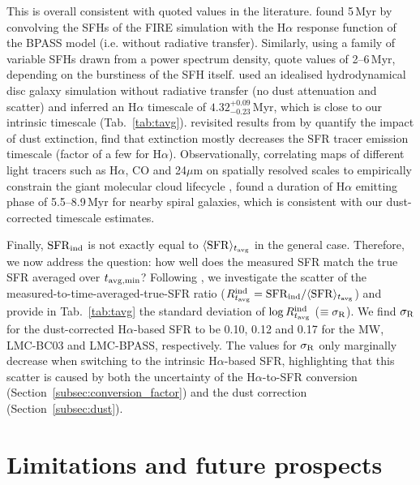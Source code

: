 \documentclass[fleqn,usenatbib]{mnras}
\begin{document}
This is overall consistent with quoted values in the literature. \citet{flores-velazquez21} found 5\,Myr by convolving the SFHs of the FIRE simulation with the H$\alpha$ response function of the BPASS model (i.e. without radiative transfer). Similarly, using a family of variable SFHs drawn from a power spectrum density, \citet{caplar19} quote values of 2--6\,Myr, depending on the burstiness of the SFH itself. \citet{haydon20} used an idealised hydrodynamical disc galaxy simulation without radiative transfer (no dust attenuation and scatter) and inferred an H$\alpha$ timescale of $4.32_{-0.23}^{+0.09}$\,Myr, which is close to our intrinsic timescale (Tab.~\ref{tab:tavg}). \citet{haydon20b} revisited results from \citet{haydon20} by quantify the impact of dust extinction, find that extinction mostly decreases the SFR tracer emission timescale (factor of a few for H$\alpha$). Observationally, correlating maps of different light tracers such as H$\alpha$, CO and 24$\mu$m on spatially resolved scales to empirically constrain the giant molecular cloud lifecycle \citep[see also][]{kruijssen19, chevance20}, \citet{kim21} found a duration of H$\alpha$ emitting phase of 5.5--8.9\,Myr for nearby spiral galaxies, which is consistent with our dust-corrected timescale estimates. 

Finally, $\mathrm{SFR}_{\rm ind}$ is not exactly equal to $\langle \mathrm{SFR}\rangle_{t_{\rm avg}}$ in the general case. Therefore, we now address the question: how well does the measured SFR match the true SFR averaged over $t_{\rm avg, min}$? Following \citet{flores-velazquez21}, we investigate the scatter of the measured-to-time-averaged-true-SFR ratio ($R_{t_{\rm avg}}^{\rm ind} = \mathrm{SFR}_{\rm ind} / \langle\mathrm{SFR}\rangle_{t_{\rm avg}}$) and provide in Tab.~\ref{tab:tavg} the standard deviation of $\log R_{t_{\rm avg}}^{\rm ind}$ ($\equiv\sigma_{\rm R}$). We find $\sigma_{\rm R}$ for the dust-corrected H$\alpha$-based SFR to be 0.10, 0.12 and 0.17 for the MW, LMC-BC03 and LMC-BPASS, respectively. The values for $\sigma_{\rm R}$ only marginally decrease when switching to the intrinsic H$\alpha$-based SFR, highlighting that this scatter is caused by both the uncertainty of the H$\alpha$-to-SFR conversion (Section~\ref{subsec:conversion_factor}) and the dust correction (Section~\ref{subsec:dust}). 


\section{Limitations and future prospects}
\label{sec:discussion}
\end{document}
